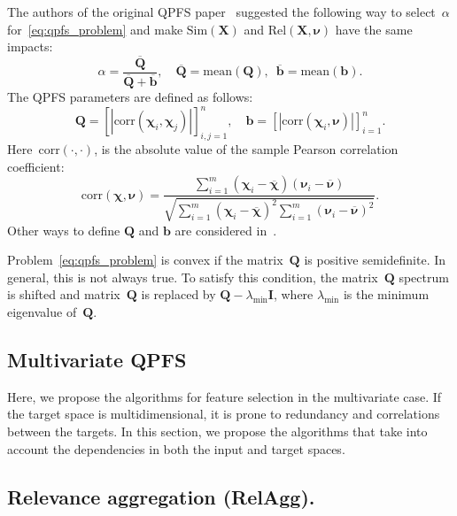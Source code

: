 \documentclass[12pt,twoside]{article}
\theoremstyle{definition}
\newcommand{\bb}{\mathbf{b}}
\newcommand{\bX}{\mathbf{X}}
\newcommand{\bQ}{\mathbf{Q}}
\newcommand{\bchi}{\boldsymbol{\chi}}
\newcommand{\bnu}{\boldsymbol{\nu}}
\begin{document}
The authors of the original QPFS paper~\cite{rodriguez2010quadratic} suggested the following way to select~$\alpha$ for~\eqref{eq:qpfs_problem} and make $\text{Sim}(\bX)$ and $\text{Rel}(\bX, \bnu)$ have the same impacts:
\begin{equation*}
\alpha = \frac{\overline{\bQ}}{\overline{\bQ} + \overline{\bb}}, \quad \overline{\bQ} = \text{mean} (\bQ), \,\,\, \overline{\bb}= \text{mean} (\bb).
\end{equation*}
The QPFS parameters are defined as follows:
\begin{equation}
\bQ = \left[|\text{corr}(\bchi_i, \bchi_j)|\right]_{i,j=1}^n, \quad \bb = \left[|\text{corr}(\bchi_i, \bnu)|\right]_{i=1}^n.
\label{eq:qpfs_1d_qb}
\end{equation}
Here~$\text{corr}(\cdot, \cdot)$, is the absolute value of the sample Pearson correlation coefficient:
\begin{equation*}
\text{corr}(\bchi, \bnu) = \frac{\sum_{i=1}^m(\bchi_i - \overline{\bchi})( \bnu_i - \overline{\bnu})}{\sqrt{\sum_{i=1}^m(\bchi_i - \overline{\bchi})^2\sum_{i=1}^m(\bnu_i - \overline{\bnu})^2}}.
\end{equation*}
Other ways to define $\bQ$ and $\bb$ are considered in~\cite{katrutsa2017comprehensive}.

Problem~\eqref{eq:qpfs_problem} is convex if the matrix~$\bQ$ is positive semidefinite. In general, this is not always true.
To satisfy this condition, the matrix~$\bQ$ spectrum is shifted and matrix~$\bQ$ is replaced by $\bQ - \lambda_{\text{min}} \mathbf{I}$, where $\lambda_{\text{min}} $ is the minimum eigenvalue of~$\bQ$.

\subsection{Multivariate QPFS}

Here, we propose the algorithms for feature selection in the multivariate case. 
If the target space is multidimensional, it is prone to redundancy and correlations between the targets. 
In this section, we propose the algorithms that take into account the dependencies in both the input and target spaces.

\subsection{Relevance aggregation (RelAgg).}
\end{document}
